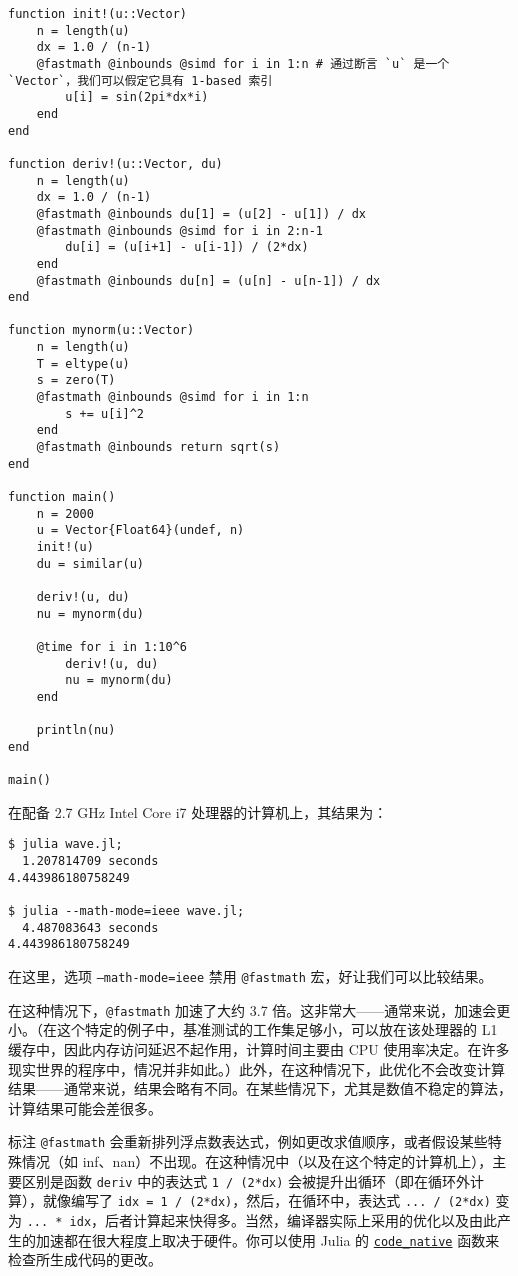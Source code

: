\begin{verbatim}
function init!(u::Vector)
    n = length(u)
    dx = 1.0 / (n-1)
    @fastmath @inbounds @simd for i in 1:n # 通过断言 `u` 是一个 `Vector`，我们可以假定它具有 1-based 索引
        u[i] = sin(2pi*dx*i)
    end
end

function deriv!(u::Vector, du)
    n = length(u)
    dx = 1.0 / (n-1)
    @fastmath @inbounds du[1] = (u[2] - u[1]) / dx
    @fastmath @inbounds @simd for i in 2:n-1
        du[i] = (u[i+1] - u[i-1]) / (2*dx)
    end
    @fastmath @inbounds du[n] = (u[n] - u[n-1]) / dx
end

function mynorm(u::Vector)
    n = length(u)
    T = eltype(u)
    s = zero(T)
    @fastmath @inbounds @simd for i in 1:n
        s += u[i]^2
    end
    @fastmath @inbounds return sqrt(s)
end

function main()
    n = 2000
    u = Vector{Float64}(undef, n)
    init!(u)
    du = similar(u)

    deriv!(u, du)
    nu = mynorm(du)

    @time for i in 1:10^6
        deriv!(u, du)
        nu = mynorm(du)
    end

    println(nu)
end

main()
\end{verbatim}



在配备 2.7 GHz Intel Core i7 处理器的计算机上，其结果为：




\begin{lstlisting}
$ julia wave.jl;
  1.207814709 seconds
4.443986180758249

$ julia --math-mode=ieee wave.jl;
  4.487083643 seconds
4.443986180758249
\end{lstlisting}



在这里，选项 \texttt{--math-mode=ieee} 禁用 \texttt{@fastmath} 宏，好让我们可以比较结果。



在这种情况下，\texttt{@fastmath} 加速了大约 3.7 倍。这非常大——通常来说，加速会更小。（在这个特定的例子中，基准测试的工作集足够小，可以放在该处理器的 L1 缓存中，因此内存访问延迟不起作用，计算时间主要由 CPU 使用率决定。在许多现实世界的程序中，情况并非如此。）此外，在这种情况下，此优化不会改变计算结果——通常来说，结果会略有不同。在某些情况下，尤其是数值不稳定的算法，计算结果可能会差很多。



标注 \texttt{@fastmath} 会重新排列浮点数表达式，例如更改求值顺序，或者假设某些特殊情况（如 inf、nan）不出现。在这种情况中（以及在这个特定的计算机上），主要区别是函数 \texttt{deriv} 中的表达式 \texttt{1 / (2*dx)} 会被提升出循环（即在循环外计算），就像编写了 \texttt{idx = 1 / (2*dx)}，然后，在循环中，表达式 \texttt{... / (2*dx)} 变为 \texttt{... * idx}，后者计算起来快得多。当然，编译器实际上采用的优化以及由此产生的加速都在很大程度上取决于硬件。你可以使用 Julia 的 \hyperlink{2534314152947301270}{\texttt{code\_native}} 函数来检查所生成代码的更改。



